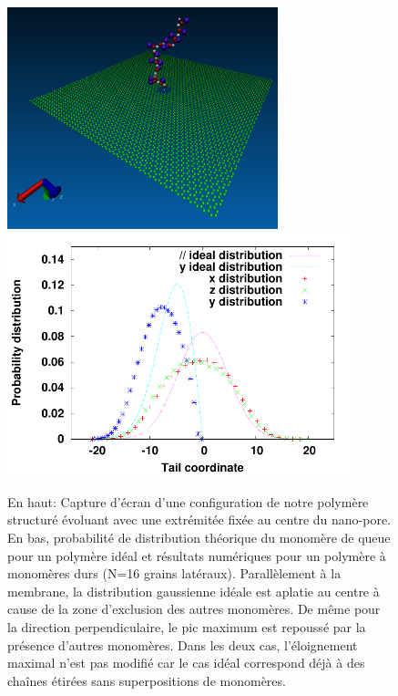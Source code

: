 \documentclass[a4paper,11pt]{article}
\begin{document}
\begin{figure}[H]
\begin{center}


\includegraphics[width=0.7\textwidth]{confinit.jpg}
\includegraphics[width=0.9\textwidth]{probdistribution.pdf}


\caption{En haut: Capture d'écran d'une configuration de notre polymère structuré évoluant avec une extrémitée fixée au centre du nano-pore. En bas, probabilité de distribution théorique du monomère de queue pour un polymère idéal et résultats numériques pour un polymère à monomères durs (N=16 grains latéraux). Parallèlement à la membrane, la distribution gaussienne idéale est aplatie au centre à cause de la zone d'exclusion des autres monomères. De même pour la direction perpendiculaire, le pic maximum est repoussé par la présence d'autres monomères. Dans les deux cas, l'éloignement maximal n'est pas modifié car le cas idéal correspond déjà à des chaînes étirées sans superpositions de monomères. }
\label{polagainstwall}
\end{center}
\end{figure}
\end{document}
